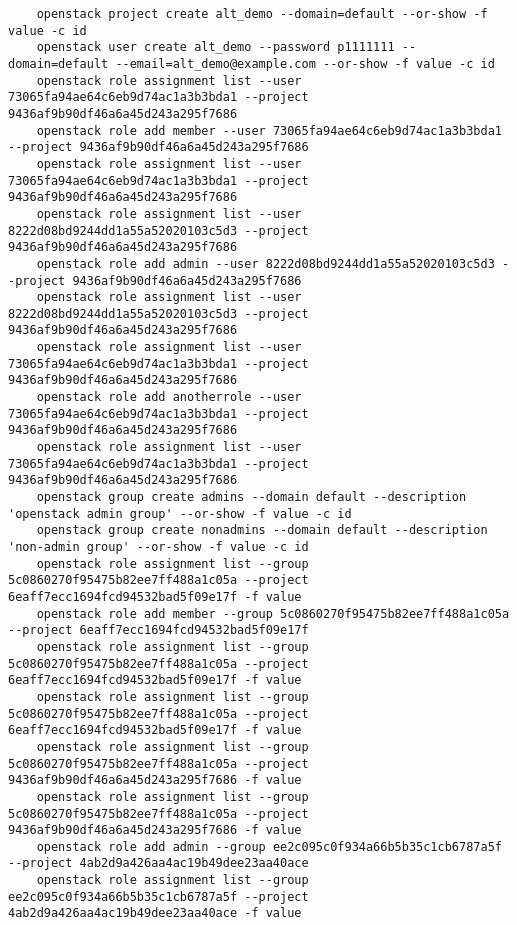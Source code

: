 \documentclass[a4paper,left=1.5cm,right=1.5cm,11pt]{article}
\begin{document}
\begin{lstlisting}
	openstack project create alt_demo --domain=default --or-show -f value -c id
	openstack user create alt_demo --password p1111111 --domain=default --email=alt_demo@example.com --or-show -f value -c id
	openstack role assignment list --user 73065fa94ae64c6eb9d74ac1a3b3bda1 --project 9436af9b90df46a6a45d243a295f7686
	openstack role add member --user 73065fa94ae64c6eb9d74ac1a3b3bda1 --project 9436af9b90df46a6a45d243a295f7686
	openstack role assignment list --user 73065fa94ae64c6eb9d74ac1a3b3bda1 --project 9436af9b90df46a6a45d243a295f7686
	openstack role assignment list --user 8222d08bd9244dd1a55a52020103c5d3 --project 9436af9b90df46a6a45d243a295f7686
	openstack role add admin --user 8222d08bd9244dd1a55a52020103c5d3 --project 9436af9b90df46a6a45d243a295f7686
	openstack role assignment list --user 8222d08bd9244dd1a55a52020103c5d3 --project 9436af9b90df46a6a45d243a295f7686
	openstack role assignment list --user 73065fa94ae64c6eb9d74ac1a3b3bda1 --project 9436af9b90df46a6a45d243a295f7686
	openstack role add anotherrole --user 73065fa94ae64c6eb9d74ac1a3b3bda1 --project 9436af9b90df46a6a45d243a295f7686
	openstack role assignment list --user 73065fa94ae64c6eb9d74ac1a3b3bda1 --project 9436af9b90df46a6a45d243a295f7686
	openstack group create admins --domain default --description 'openstack admin group' --or-show -f value -c id
	openstack group create nonadmins --domain default --description 'non-admin group' --or-show -f value -c id
	openstack role assignment list --group 5c0860270f95475b82ee7ff488a1c05a --project 6eaff7ecc1694fcd94532bad5f09e17f -f value
	openstack role add member --group 5c0860270f95475b82ee7ff488a1c05a --project 6eaff7ecc1694fcd94532bad5f09e17f
	openstack role assignment list --group 5c0860270f95475b82ee7ff488a1c05a --project 6eaff7ecc1694fcd94532bad5f09e17f -f value
	openstack role assignment list --group 5c0860270f95475b82ee7ff488a1c05a --project 6eaff7ecc1694fcd94532bad5f09e17f -f value
	openstack role assignment list --group 5c0860270f95475b82ee7ff488a1c05a --project 9436af9b90df46a6a45d243a295f7686 -f value
	openstack role assignment list --group 5c0860270f95475b82ee7ff488a1c05a --project 9436af9b90df46a6a45d243a295f7686 -f value
	openstack role add admin --group ee2c095c0f934a66b5b35c1cb6787a5f --project 4ab2d9a426aa4ac19b49dee23aa40ace
	openstack role assignment list --group ee2c095c0f934a66b5b35c1cb6787a5f --project 4ab2d9a426aa4ac19b49dee23aa40ace -f value
	\end{lstlisting}
\end{document}
